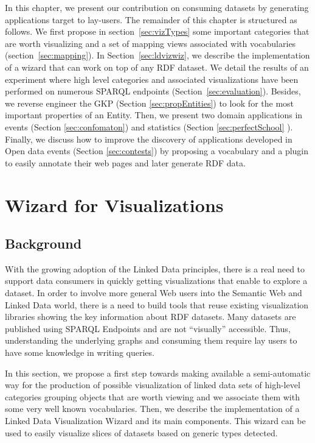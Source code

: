In this chapter, we present our contribution on consuming datasets by generating applications target to lay-users. The remainder  of this chapter is structured as follows. We first propose in section~\ref{sec:vizTypes} some important categories that are worth visualizing and a set of mapping views associated with vocabularies (section~\ref{sec:mapping}). In Section~\ref{sec:ldvizwiz}, we describe the implementation of a wizard that can work on top of any RDF dataset. We detail the results of an experiment where high level categories and associated visualizations have been performed on numerous SPARQL endpoints (Section~\ref{sec:evaluation}). Besides, we reverse engineer the GKP (Section \ref{sec:propEntities}) to look for the most important properties of an Entity. Then, we present two domain applications in events (Section \ref{sec:confomaton}) and statistics (Section \ref{sec:perfectSchool} ). Finally, we discuss how to improve the discovery of applications developed in Open data events (Section \ref{sec:contests}) by proposing a vocabulary and a plugin to easily annotate their web pages  and later generate RDF data.  
 


\section{Wizard for Visualizations}
\label{sec:wizviz}

\subsection{Background}
With the growing adoption of the Linked Data principles, there is a real need to support data consumers in quickly getting visualizations that enable to explore a dataset. In order to involve more general Web users into the Semantic Web and Linked Data world, there is a need to build tools that reuse existing visualization libraries showing the key information about RDF datasets. Many datasets are published using SPARQL Endpoints and are not ``visually'' accessible. Thus, understanding the underlying graphs and consuming them require lay users to have some knowledge in writing queries. 

In this section, we propose a first step towards making available a semi-automatic way for the production of possible visualization of linked data sets of high-level categories grouping objects that are worth viewing and we associate them with some very well known vocabularies. Then, we describe the implementation of a Linked Data Visualization Wizard and its main components. This wizard can be used to easily visualize slices of datasets based on generic types detected.


